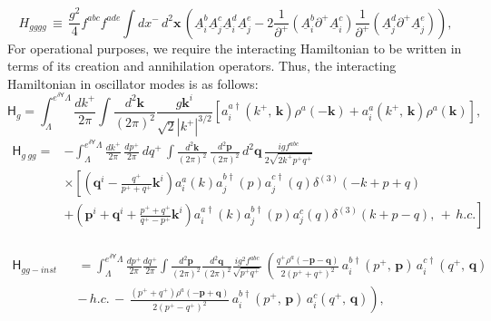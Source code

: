 \documentclass[aps,prd,amsmath,amssymb,nofootinbib]{revtex4-2}
\numberwithin{equation}{section}
\begin{document}
 \begin{equation}H_{gggg}\,\equiv\,\frac{g^{2}}{4}f^{abc}f^{ade}\int dx^{-}\, d^{2}\mathbf{x}\,\left(\underline{A}_{i}^{b}\underline{A}_{j}^{c}\underline{A}_{i}^{d}\underline{A}_{j}^{e}-2\frac{1}{\partial^{+}}(\underline{A}_{i}^{b}\partial^{+}\underline{A}_{i}^{c})\frac{1}{\partial^{+}}(\underline{A}_{j}^{d}\partial^{+}\underline{A}_{j}^{e})\right),
 \end{equation}
For operational purposes, we require the interacting Hamiltonian to be written in terms of its creation and annihilation operators. Thus, the interacting Hamiltonian in oscillator modes is as follows:
 \begin{equation}\label{eikohg}
\mathsf{H}_{g}=\int_{\Lambda}^{e^{\delta\mathsf{Y}}\Lambda}\frac{dk^{+}}{2\pi}\int\frac{d^{2}\mathbf{k}}{(2\pi)^{2}}\frac{g\mathbf{k}^{i}}{\sqrt{2}|k^{+}|^{3/2}}\left[a_{i}^{a\dagger}(k^{+},\, \mathbf{k})\rho^{a}(-\mathbf{k})+a_{i}^{a}(k^{+},\, \mathbf{k})\rho^{a}(\mathbf{k})\right],
 \end{equation}
 \begin{equation}\begin{split}
\mathsf{H}_{g\: gg}=&-\int_{\Lambda}^{e^{\delta\mathsf{Y}}\Lambda}\frac{dk^{+}}{2\pi}\,\frac{dp^{+}}{2\pi}\, dq^{+}\,\int\frac{d^{2}\mathbf{k}}{(2\pi)^{2}}\,\frac{d^{2}\mathbf{p}}{(2\pi)^{2}}\, d^{2}\mathbf{q}\,\frac{igf^{abc}}{2\sqrt{2k^{+}p^{+}q^{+}}}\\
&\times\left[\left(\mathbf{q}^{i}-\frac{q^{+}}{p^{+}+q^{+}}\mathbf{k}^{i}\right)a_{i}^{a}(k)a_{j}^{b\dagger}(p)a_{j}^{c\dagger}(q)\delta^{(3)}(-k+p+q)\right.\\
&+\left.\left(\mathbf{p}^{i}+\mathbf{q}^{i}+\frac{p^{+}+q^{+}}{q^{+}-p^{+}}\mathbf{k}^{i}\right)a_{i}^{a\dagger}(k)a_{j}^{b\dagger}(p)a_{j}^{c}(q)\delta^{(3)}(k+p-q),\,+\,h.c.\right]\\
 \end{split}\end{equation}

    \begin{eqnarray}
\mathsf{H}_{gg-inst}&&=\int_{\Lambda}^{e^{\delta\mathsf{Y}}\Lambda}\frac{dp^{+}}{2\pi}\frac{dq^{+}}{2\pi}\int\frac{d^{2}\mathbf{p}}{(2\pi)^{2}}\frac{d^{2}\mathbf{q}}{(2\pi)^{2}}\frac{ig^{2}f^{abc}}{\sqrt{p^{+}q^{+}}}\,\left(\frac{q^{+}\rho^{a}(-\mathbf{p}-\mathbf{q})}{2(p^{+}+q^{+})^{2}}\, a_{i}^{b\dagger}(p^{+},\,\mathbf{p})\, a_{i}^{c\dagger}(q^{+},\,\mathbf{q})\right.\nonumber\\
&&\left.-\, h.c.\,-\,\frac{(p^{+}+q^{+})\rho^{a}(-\mathbf{p}+\mathbf{q})}{2(p^{+}-q^{+})^{2}}\, a_{i}^{b\dagger}(p^{+},\,\mathbf{p})\, a_{i}^{c}(q^{+},\,\mathbf{q})\right),\end{eqnarray}
\end{document}
